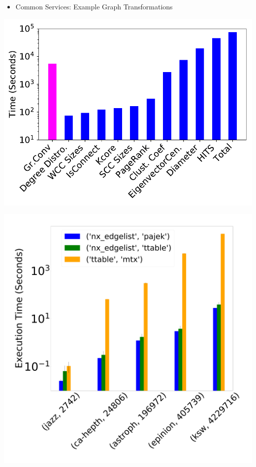 \documentclass[landscape,paperwidth=70in,paperheight=46in,fontscale=0.225]{baposter} %
\begin{document}
\begin{poster}
{%
\begin{itemize}[leftmargin=*,noitemsep,topsep=0pt]
\item Common Services:  Example Graph Transformations
\end{itemize} 
\hfill
\begin{minipage}{0.45\linewidth}
\includegraphics[scale=0.27]{figures/g4_timing.pdf} 
\end{minipage}
\hfill
\begin{minipage}{0.45\linewidth}
\includegraphics[scale=0.038]{figures/scatter_bar_to_ttable.pdf}

\end{minipage}}
\end{poster}
\end{document}
